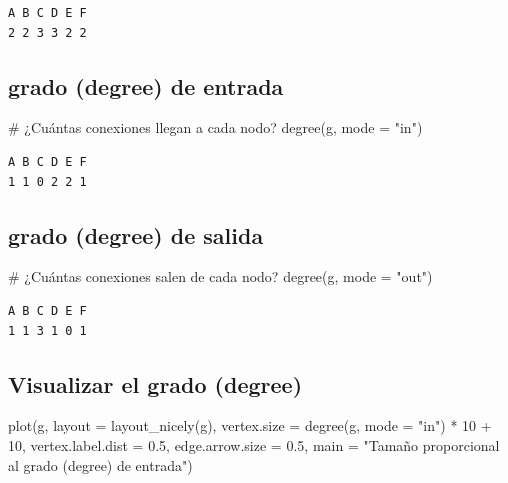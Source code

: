\documentclass[
  letterpaper,
  DIV=11,
  numbers=noendperiod]{scrreprt}
\newenvironment{Shaded}{\begin{snugshade}}{\end{snugshade}}
\newcommand{\AttributeTok}[1]{\textcolor[rgb]{0.40,0.45,0.13}{#1}}
\newcommand{\CommentTok}[1]{\textcolor[rgb]{0.37,0.37,0.37}{#1}}
\newcommand{\DecValTok}[1]{\textcolor[rgb]{0.68,0.00,0.00}{#1}}
\newcommand{\FloatTok}[1]{\textcolor[rgb]{0.68,0.00,0.00}{#1}}
\newcommand{\FunctionTok}[1]{\textcolor[rgb]{0.28,0.35,0.67}{#1}}
\newcommand{\NormalTok}[1]{\textcolor[rgb]{0.00,0.23,0.31}{#1}}
\newcommand{\SpecialCharTok}[1]{\textcolor[rgb]{0.37,0.37,0.37}{#1}}
\newcommand{\StringTok}[1]{\textcolor[rgb]{0.13,0.47,0.30}{#1}}
\begin{document}
\begin{verbatim}
A B C D E F 
2 2 3 3 2 2 
\end{verbatim}

\subsection{grado (degree) de entrada}

\begin{Shaded}
\begin{Highlighting}[]
\CommentTok{\# ¿Cuántas conexiones llegan a cada nodo?}
\FunctionTok{degree}\NormalTok{(g, }\AttributeTok{mode =} \StringTok{"in"}\NormalTok{)}
\end{Highlighting}
\end{Shaded}

\begin{verbatim}
A B C D E F 
1 1 0 2 2 1 
\end{verbatim}

\subsection{grado (degree) de salida}

\begin{Shaded}
\begin{Highlighting}[]
\CommentTok{\# ¿Cuántas conexiones salen de cada nodo?}
\FunctionTok{degree}\NormalTok{(g, }\AttributeTok{mode =} \StringTok{"out"}\NormalTok{)}
\end{Highlighting}
\end{Shaded}

\begin{verbatim}
A B C D E F 
1 1 3 1 0 1 
\end{verbatim}

\subsection{Visualizar el grado
(degree)}\label{visualizar-el-grado-degree}

\begin{Shaded}
\begin{Highlighting}[]
\FunctionTok{plot}\NormalTok{(g, }
     \AttributeTok{layout =} \FunctionTok{layout\_nicely}\NormalTok{(g),}
     \AttributeTok{vertex.size =} \FunctionTok{degree}\NormalTok{(g, }\AttributeTok{mode =} \StringTok{"in"}\NormalTok{) }\SpecialCharTok{*} \DecValTok{10} \SpecialCharTok{+} \DecValTok{10}\NormalTok{,}
     \AttributeTok{vertex.label.dist =} \FloatTok{0.5}\NormalTok{,}
     \AttributeTok{edge.arrow.size =} \FloatTok{0.5}\NormalTok{,}
     \AttributeTok{main =} \StringTok{"Tamaño proporcional al grado (degree) de entrada"}\NormalTok{)}
\end{Highlighting}
\end{Shaded}
\end{document}
